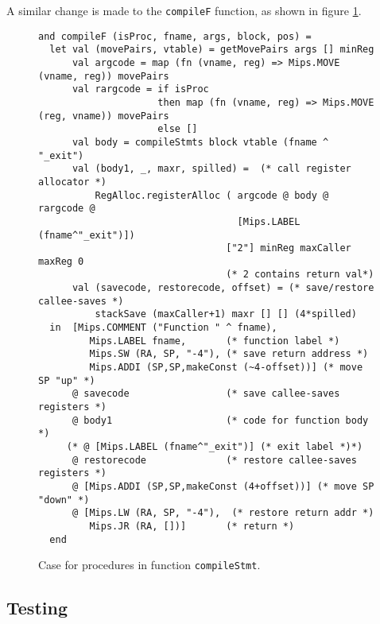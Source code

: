 \noindent
A similar change is made to the \verb|compileF| function, as shown in figure
\ref{fig_compileF}.

\begin{figure}[H]
  \begin{lstlisting}[style=MLStyle]
and compileF (isProc, fname, args, block, pos) =
  let val (movePairs, vtable) = getMovePairs args [] minReg
      val argcode = map (fn (vname, reg) => Mips.MOVE (vname, reg)) movePairs
      val rargcode = if isProc
                     then map (fn (vname, reg) => Mips.MOVE (reg, vname)) movePairs
                     else []
      val body = compileStmts block vtable (fname ^ "_exit")
      val (body1, _, maxr, spilled) =  (* call register allocator *)
          RegAlloc.registerAlloc ( argcode @ body @ rargcode @
                                   [Mips.LABEL (fname^"_exit")])
                                 ["2"] minReg maxCaller maxReg 0
                                 (* 2 contains return val*)
      val (savecode, restorecode, offset) = (* save/restore callee-saves *)
          stackSave (maxCaller+1) maxr [] [] (4*spilled)
  in  [Mips.COMMENT ("Function " ^ fname),
         Mips.LABEL fname,       (* function label *)
         Mips.SW (RA, SP, "-4"), (* save return address *)
         Mips.ADDI (SP,SP,makeConst (~4-offset))] (* move SP "up" *)
      @ savecode                 (* save callee-saves registers *)
      @ body1                    (* code for function body *)
     (* @ [Mips.LABEL (fname^"_exit")] (* exit label *)*)
      @ restorecode              (* restore callee-saves registers *)
      @ [Mips.ADDI (SP,SP,makeConst (4+offset))] (* move SP "down" *)
      @ [Mips.LW (RA, SP, "-4"),  (* restore return addr *)
         Mips.JR (RA, [])]       (* return *)
  end
  \end{lstlisting}
  \caption{Case for procedures in function \texttt{compileStmt}.}
  \label{fig_compileF}
\end{figure}


\subsection{Testing}
